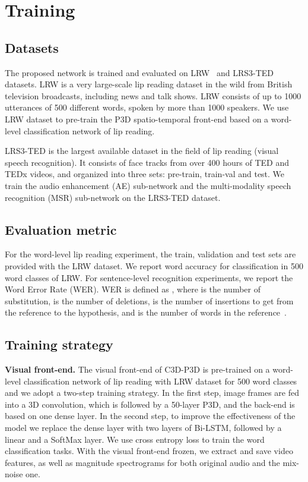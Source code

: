 \documentclass[10pt,twocolumn,letterpaper]{article}
\begin{document}
\section{Training}

\subsection{Datasets}

The proposed network is trained and evaluated on LRW~\cite{chung2016lip} and LRS3-TED~\cite{afouras2018lrs3} datasets. LRW is a very large-scale lip reading dataset in the wild from British television broadcasts, including news and talk shows. LRW consists of up to 1000 utterances of 500 different words, spoken by more than 1000 speakers. We use LRW dataset to pre-train the P3D spatio-temporal front-end based on a word-level classification network of lip reading.  

LRS3-TED is the largest available dataset in the field of lip reading (visual speech recognition). It consists of face tracks from over 400 hours of TED and TEDx videos, and organized into three sets: pre-train, train-val and test. We train the audio enhancement (AE) sub-network and the multi-modality speech recognition (MSR) sub-network on the LRS3-TED dataset.
\subsection{Evaluation metric}
For the word-level lip reading experiment, the train, validation and test sets are provided with the LRW dataset. We report word accuracy for classification in 500 word classes of LRW. For sentence-level recognition experiments, we report the Word Error Rate (WER). WER is defined as , where  is the number of substitution,  is the number of deletions,  is the number of insertions to get from the reference to the hypothesis, and  is the number of words in the reference~\cite{chung2017lip}. 


\subsection{Training strategy}\label{training_strategy}
{\bf Visual front-end.} The visual front-end of C3D-P3D is pre-trained on a word-level classification network of lip reading with LRW dataset for 500 word classes and we adopt a two-step training strategy. In the first step, image frames are fed into a 3D convolution, which is followed by a 50-layer P3D, and the back-end is based on one dense layer. In the second step, to improve the effectiveness of the model we replace the dense layer with two layers of Bi-LSTM, followed by a linear and a SoftMax layer. We use cross entropy loss to train the word classification tasks. With the visual front-end frozen, we extract and save video features, as well as magnitude spectrograms for both original audio and the mix-noise one.
\end{document}
